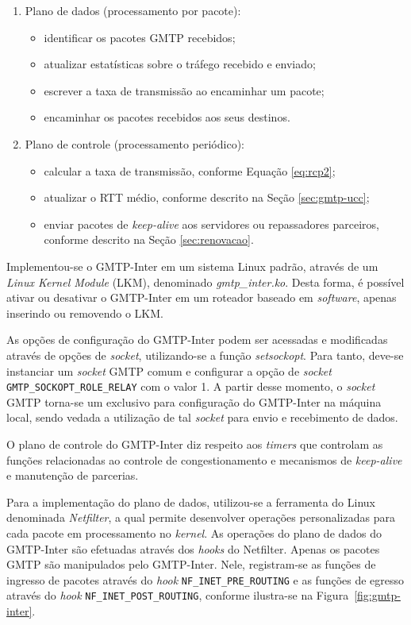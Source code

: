 \begin{enumerate}
\item Plano de dados (processamento por pacote):
	\begin{itemize}
	\item identificar os pacotes GMTP recebidos;
	\item atualizar estatísticas sobre o tráfego recebido e enviado;
	\item escrever a taxa de transmissão ao encaminhar um pacote;
	\item encaminhar os pacotes recebidos aos seus destinos.
	\end{itemize}
\item Plano de controle (processamento periódico):
	\begin{itemize}
	\item calcular a taxa de transmissão, conforme Equação \ref{eq:rcp2};
	\item atualizar o RTT médio, conforme descrito na Seção \ref{sec:gmtp-ucc};
	\item enviar pacotes de \textit{keep-alive} aos servidores ou repassadores parceiros, conforme descrito na Seção \ref{sec:renovacao}.
	\end{itemize}
\end{enumerate}

Implementou-se o GMTP-Inter em um sistema Linux padrão, através de um \textit{Linux Kernel Module} (LKM), denominado \textit{gmtp\_inter.ko}. Desta forma, é possível ativar ou desativar o GMTP-Inter em um roteador baseado em \textit{software}, apenas inserindo ou removendo o LKM.

As opções de configuração do GMTP-Inter podem ser acessadas e modificadas através de opções de \textit{socket}, utilizando-se a função \textit{setsockopt}.
Para tanto, deve-se instanciar um \textit{socket} GMTP comum e configurar a opção de \textit{socket} \lstinline|GMTP_SOCKOPT_ROLE_RELAY| com o valor 1. A partir desse momento, o \textit{socket} GMTP torna-se um exclusivo para configuração do GMTP-Inter na máquina local, sendo vedada a utilização de tal \textit{socket} para envio e recebimento de dados.

O plano de controle do GMTP-Inter diz respeito aos \textit{timers} que controlam as funções relacionadas ao controle de congestionamento e mecanismos de \textit{keep-alive} e manutenção de parcerias.

Para a implementação do plano de dados, utilizou-se a ferramenta do Linux denominada \emph{Netfilter}, a qual permite desenvolver operações personalizadas para cada pacote em processamento no \textit{kernel}.
As operações do plano de dados do GMTP-Inter são efetuadas através dos \textit{hooks} do Netfilter.
Apenas os pacotes GMTP são manipulados pelo GMTP-Inter.
Nele, registram-se as funções de ingresso de pacotes através do \textit{hook}  \lstinline|NF_INET_PRE_ROUTING| e as funções de egresso através do \textit{hook} \lstinline|NF_INET_POST_ROUTING|, conforme ilustra-se na Figura~\ref{fig:gmtp-inter}.

